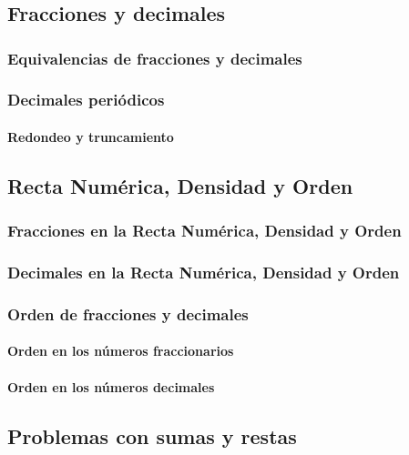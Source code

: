 \documentclass[11pt]{book}
\begin{document}
\pagestyle{empty}

\restoregeometry
{}
\tableofcontents
\chapter{}
\section{Fracciones y decimales}
\subsection{Equivalencias de fracciones y decimales}
\subsection{Decimales peri\'odicos}
\subsubsection{Redondeo y truncamiento}

\newpage
\section{Recta Num\'erica, Densidad y Orden}
\subsection{Fracciones en la Recta Num\'erica, Densidad y Orden}
\subsection{Decimales en la Recta Num\'erica, Densidad y Orden}
\subsection{Orden de fracciones y decimales}
\subsubsection{Orden en los n\'umeros fraccionarios}
\subsubsection{Orden en los n\'umeros decimales}

\newpage
\section{Problemas con sumas y restas}
\end{document}
